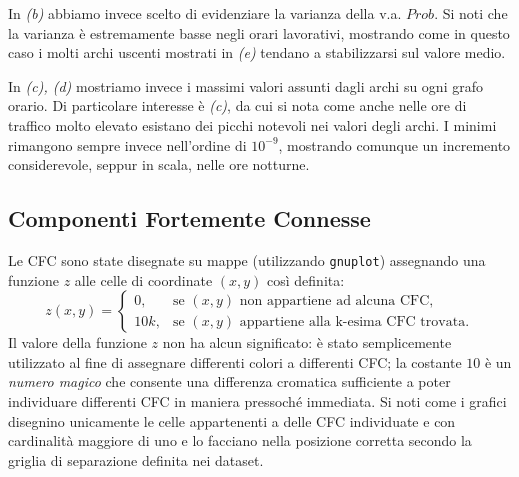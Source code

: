 \documentclass[10pt,a4paper]{article}
\begin{document}
In \emph{(b)} abbiamo invece scelto di evidenziare la varianza della v.a. $Prob$. Si noti che la varianza è estremamente basse negli orari lavorativi, mostrando come in questo caso i molti archi uscenti mostrati in \emph{(e)} tendano a stabilizzarsi sul valore medio.

In \emph{(c), (d)} mostriamo invece i massimi valori assunti dagli archi su ogni grafo orario. Di particolare interesse è \emph{(c)}, da cui si nota come anche nelle ore di traffico molto elevato esistano dei picchi notevoli nei valori degli archi. I minimi rimangono sempre invece nell'ordine di $10^{-9}$, mostrando comunque un incremento considerevole, seppur in scala, nelle ore notturne.
 
\subsection{Componenti Fortemente Connesse}

Le CFC sono state disegnate su mappe (utilizzando \verb!gnuplot!) assegnando una funzione $z$ alle celle di
coordinate $(x,y)$ così definita:
$$
z(x,y) =
\begin{cases}
0, & \text{se $(x,y)$ non appartiene ad alcuna CFC,} \\
10k, & \text{se $(x,y)$ appartiene alla k-esima CFC trovata.}
\end{cases}
$$
Il valore della funzione $z$ non ha alcun significato: è stato semplicemente utilizzato al fine di assegnare differenti colori a differenti CFC; la costante $10$ è un \emph{numero magico} che consente una differenza cromatica sufficiente a poter individuare differenti CFC in maniera pressoché immediata. Si noti come i grafici disegnino unicamente le celle appartenenti a delle CFC individuate e con cardinalità maggiore di uno e lo facciano nella posizione corretta secondo la griglia di separazione definita nei dataset.
\end{document}
